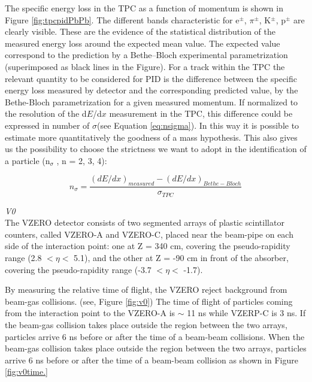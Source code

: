 The specific energy loss in the TPC as a function of momentum is shown in Figure \ref{fig:tpcpidPbPb}. The different bands characteristic for e$^{\pm}$, $\pi^{\pm}$, K$^{\pm}$, p$^{\pm}$ are clearly visible. These are the evidence of the statistical distribution of the measured energy loss around the expected mean value. The expected value correspond to the prediction by a Bethe--Bloch experimental parametrization (superimposed as black lines in the Figure). For a track within the TPC the relevant quantity to be considered for PID is the difference between the specific energy loss measured by detector and the corresponding predicted value, by the Bethe-Bloch parametrization for a given measured momentum. If normalized to the resolution of the d$E$/d$x$ measurement in the TPC, this difference could be expressed in number of $\sigma$(see Equation \ref{eq:nsigma}). In this way it is possible to estimate more quantitatively the goodness of a mass hypothesis. This also gives us the possibility to choose the strictness we want to adopt in the identification of a particle (n$_{\sigma}$ , n = 2, 3, 4):

\begin{equation}\label{eq:nsigma}
n_{\sigma} = \frac{(dE/dx)_{measured}-(dE/dx)_{Bethe-Bloch}}{\sigma_{TPC}}
\end{equation}


{\Large\textsl{V0}}\\
The VZERO detector \cite{cite:V0} consists of two segmented arrays of plastic scintillator counters, called VZERO-A and VZERO-C, placed near the beam-pipe on each side of the interaction point: one at Z = 340 cm, covering the pseudo-rapidity range (2.8 $< \eta <$ 5.1), and the other at Z = -90 cm in front of the absorber, covering the pseudo-rapidity range (-3.7 $< \eta <$ -1.7). 


By measuring the relative time of flight, the VZERO reject background from beam-gas collisions. (see, Figure \ref{fig:v0}) The time of flight of particles coming from the interaction point to the VZERO-A is $\sim$ 11 ns while VZERP-C is 3 ns. If the beam-gas collision takes place outside the region between the two arrays, particles arrive 6 ns before or after the time of a beam-beam collisions. When the beam-gas collision takes place outside the region between the two arrays, particles arrive 6 ns before or after the time of a beam-beam collision as shown in Figure \ref{fig:v0time.}


